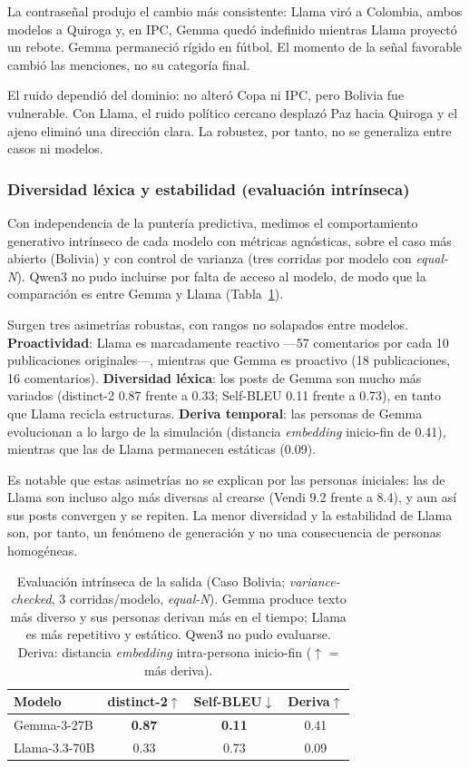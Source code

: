 \documentclass[11pt]{article}
\begin{document}
La contraseñal produjo el cambio más consistente: Llama viró a Colombia, ambos modelos a Quiroga y, en IPC, Gemma quedó indefinido mientras Llama proyectó un rebote. Gemma permaneció rígido en fútbol. El momento de la señal favorable cambió las menciones, no su categoría final.

El ruido dependió del dominio: no alteró Copa ni IPC, pero Bolivia fue vulnerable. Con Llama, el ruido político cercano desplazó Paz hacia Quiroga y el ajeno eliminó una dirección clara. La robustez, por tanto, no se generaliza entre casos ni modelos.

\subsubsection{Diversidad léxica y estabilidad (evaluación intrínseca)}

Con independencia de la puntería predictiva, medimos el comportamiento generativo intrínseco de cada modelo con métricas agnósticas, sobre el caso más abierto (Bolivia) y con control de varianza (tres corridas por modelo con \textit{equal-N}). Qwen3 no pudo incluirse por falta de acceso al modelo, de modo que la comparación es entre Gemma y Llama (Tabla~\ref{tab:intrinseca}).

Surgen tres asimetrías robustas, con rangos no solapados entre modelos. \textbf{Proactividad}: Llama es marcadamente reactivo —57 comentarios por cada 10 publicaciones originales—, mientras que Gemma es proactivo (18 publicaciones, 16 comentarios). \textbf{Diversidad léxica}: los posts de Gemma son mucho más variados (distinct-2 0.87 frente a 0.33; Self-BLEU 0.11 frente a 0.73), en tanto que Llama recicla estructuras. \textbf{Deriva temporal}: las personas de Gemma evolucionan a lo largo de la simulación (distancia \textit{embedding} inicio-fin de 0.41), mientras que las de Llama permanecen estáticas (0.09).

Es notable que estas asimetrías no se explican por las personas iniciales: las de Llama son incluso algo más diversas al crearse (Vendi 9.2 frente a 8.4), y aun así sus posts convergen y se repiten. La menor diversidad y la estabilidad de Llama son, por tanto, un fenómeno de generación y no una consecuencia de personas homogéneas.

\begin{table}[t]
\centering
\small
\begin{tabular}{@{}lccc@{}}
\toprule
\textbf{Modelo} & \textbf{distinct-2}$\uparrow$ & \textbf{Self-BLEU}$\downarrow$ & \textbf{Deriva}$\uparrow$ \\
\midrule
Gemma-3-27B & \textbf{0.87} & \textbf{0.11} & 0.41 \\
Llama-3.3-70B & 0.33 & 0.73 & 0.09 \\
\bottomrule
\end{tabular}
\caption{Evaluación intrínseca de la salida (Caso Bolivia; \textit{variance-checked}, 3 corridas/modelo, \textit{equal-N}). Gemma produce texto más diverso y sus personas derivan más en el tiempo; Llama es más repetitivo y estático. Qwen3 no pudo evaluarse. Deriva: distancia \textit{embedding} intra-persona inicio-fin ($\uparrow$ = más deriva).}
\label{tab:intrinseca}
\end{table}
\end{document}

